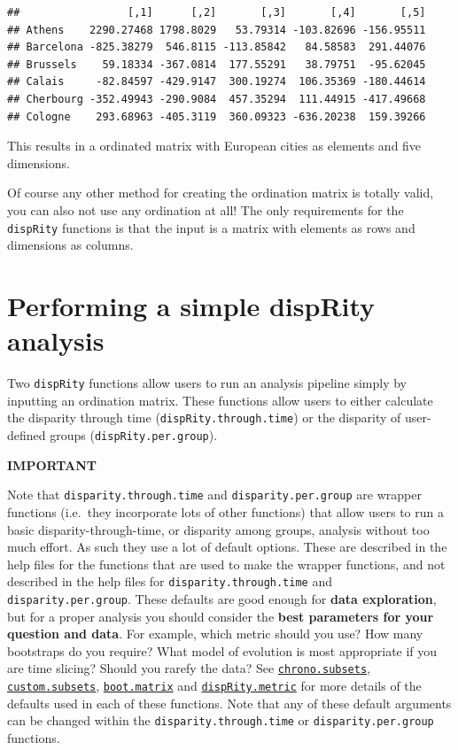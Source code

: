 \documentclass[]{book}
\begin{document}
\begin{verbatim}
##                 [,1]      [,2]       [,3]       [,4]       [,5]
## Athens    2290.27468 1798.8029   53.79314 -103.82696 -156.95511
## Barcelona -825.38279  546.8115 -113.85842   84.58583  291.44076
## Brussels    59.18334 -367.0814  177.55291   38.79751  -95.62045
## Calais     -82.84597 -429.9147  300.19274  106.35369 -180.44614
## Cherbourg -352.49943 -290.9084  457.35294  111.44915 -417.49668
## Cologne    293.68963 -405.3119  360.09323 -636.20238  159.39266
\end{verbatim}

This results in a ordinated matrix with European cities as elements and five dimensions.

Of course any other method for creating the ordination matrix is totally valid, you can also not use any ordination at all!
The only requirements for the \texttt{dispRity} functions is that the input is a matrix with elements as rows and dimensions as columns.

\hypertarget{simpleanalysis}{%
\section{Performing a simple dispRity analysis}\label{simpleanalysis}}

Two \texttt{dispRity} functions allow users to run an analysis pipeline simply by inputting an ordination matrix.
These functions allow users to either calculate the disparity through time (\texttt{dispRity.through.time}) or the disparity of user-defined groups (\texttt{dispRity.per.group}).

\textbf{IMPORTANT}

Note that \texttt{disparity.through.time} and \texttt{disparity.per.group} are wrapper functions (i.e.~they incorporate lots of other functions) that allow users to run a basic disparity-through-time, or disparity among groups, analysis without too much effort.
As such they use a lot of default options.
These are described in the help files for the functions that are used to make the wrapper functions, and not described in the help files for \texttt{disparity.through.time} and \texttt{disparity.per.group}.
These defaults are good enough for \textbf{data exploration}, but for a proper analysis you should consider the \textbf{best parameters for your question and data}.
For example, which metric should you use?
How many bootstraps do you require?
What model of evolution is most appropriate if you are time slicing?
Should you rarefy the data?
See \protect\hyperlink{time-slicing}{\texttt{chrono.subsets}}, \protect\hyperlink{customised-subsets}{\texttt{custom.subsets}}, \protect\hyperlink{bootstraps-and-rarefactions}{\texttt{boot.matrix}} and \protect\hyperlink{disparity-metrics}{\texttt{dispRity.metric}} for more details of the defaults used in each of these functions.
Note that any of these default arguments can be changed within the \texttt{disparity.through.time} or \texttt{disparity.per.group} functions.
\end{document}
